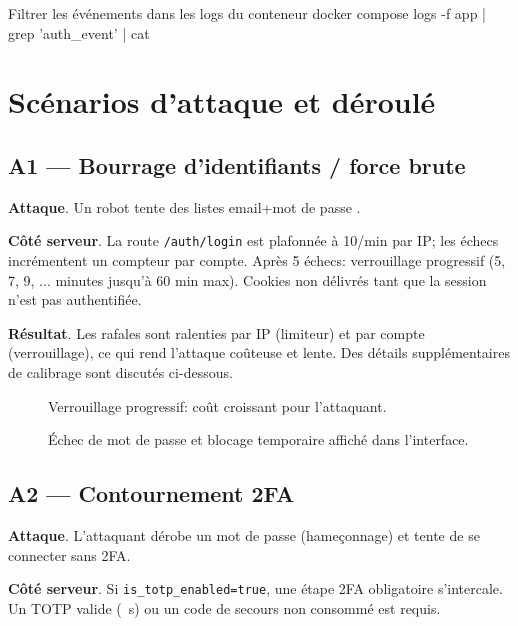 \begin{codebox}[language=bash]{Filtrer les événements dans les logs du conteneur}
docker compose logs -f app | grep 'auth_event' | cat
\end{codebox}

\section{Scénarios d'attaque et déroulé}

\subsection*{A1 — Bourrage d'identifiants / force brute}
\textbf{Attaque}. Un robot tente des listes \og email+mot de passe \fg{}.

\textbf{Côté serveur}. La route \texttt{/auth/login} est plafonnée à 10/min par IP; les échecs incrémentent un compteur par compte. Après 5 échecs: verrouillage progressif (5, 7, 9, ... minutes jusqu'à 60 min max). Cookies non délivrés tant que la session n'est pas authentifiée.

\textbf{Résultat}. Les rafales sont ralenties par IP (limiteur) et par compte (verrouillage), ce qui rend l'attaque coûteuse et lente. Des détails supplémentaires de calibrage sont discutés ci-dessous.

\begin{figure}[h]
  \centering
  \caption{Verrouillage progressif: coût croissant pour l'attaquant.}
\end{figure}

\begin{figure}[h]
  \centering
  \caption{Échec de mot de passe et blocage temporaire affiché dans l'interface.}
\end{figure}

\subsection*{A2 — Contournement 2FA}
\textbf{Attaque}. L'attaquant dérobe un mot de passe (hameçonnage) et tente de se connecter sans 2FA.

\textbf{Côté serveur}. Si \texttt{is\_totp\_enabled=true}, une étape 2FA obligatoire s'intercale. Un TOTP valide (~s) ou un code de secours non consommé est requis.

